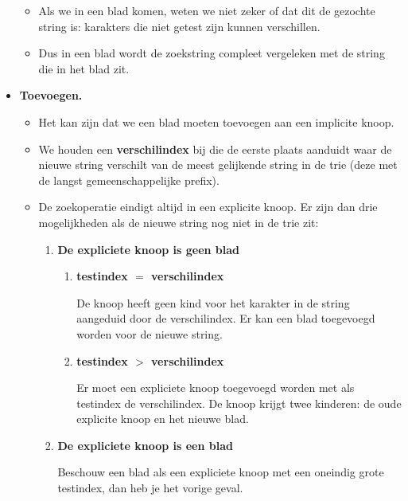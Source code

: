 \begin{itemize}
\begin{itemize}
        \item Als we in een blad komen, weten we niet zeker of dat dit de gezochte string is: karakters die niet getest zijn kunnen verschillen.
        \item Dus in een blad wordt de zoekstring compleet vergeleken met de string die in het blad zit.
    \end{itemize}
    \item \textbf{Toevoegen.}
    \begin{itemize}
        \item Het kan zijn dat we een blad moeten toevoegen aan een implicite knoop.
        \item We houden een \textbf{verschilindex} bij die de eerste plaats aanduidt waar de nieuwe string verschilt van de meest gelijkende string in de trie (deze met de langst gemeenschappelijke prefix).
        \item De zoekoperatie eindigt altijd in een explicite knoop. Er zijn dan drie mogelijkheden als de nieuwe string nog niet in de trie zit:
        \begin{enumerate}
            \item \textbf{De expliciete knoop is geen blad}
            \begin{enumerate}
                \item \textbf{testindex $=$ verschilindex}
                                                                           
                De knoop heeft geen kind voor het karakter in de string aangeduid door de verschilindex. Er kan een blad toegevoegd worden voor de nieuwe string.
                \item \textbf{testindex $>$ verschilindex}
    
                Er moet een expliciete knoop toegevoegd worden met als testindex de verschilindex. De knoop krijgt twee kinderen: de oude explicite knoop en het nieuwe blad. 
            \end{enumerate}

            \item  \textbf{De expliciete knoop is een blad}
            
            Beschouw een blad als een expliciete knoop met een oneindig grote testindex, dan heb je het vorige geval.
        \end{enumerate}
    \end{itemize}

\end{itemize}



